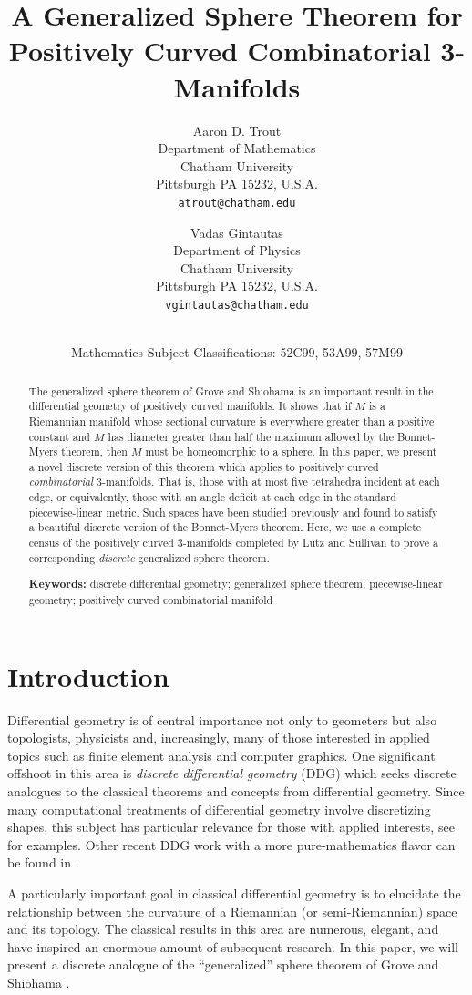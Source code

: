 \documentclass[12pt]{article}
\title{A Generalized Sphere Theorem for\\Positively Curved Combinatorial 3-Manifolds}
\author{Aaron D. Trout\\
\small Department of Mathematics\\[-0.8ex]
\small Chatham University\\[-0.8ex] 
\small Pittsburgh PA 15232,  U.S.A.\\
\small\tt atrout@chatham.edu\\
\and
Vadas Gintautas\\
\small Department of Physics\\[-0.8ex]
\small Chatham University\\[-0.8ex] 
\small Pittsburgh PA 15232,  U.S.A.\\
\small\tt vgintautas@chatham.edu}
\date{\dateline{June 25, 2013}{XX}\\
\small Mathematics Subject Classifications: 52C99, 53A99, 57M99}
\theoremstyle{plain}
\theoremstyle{definition}
\theoremstyle{remark}
\begin{document}
\maketitle

\begin{abstract}
The generalized sphere theorem of Grove and Shiohama is an important result in the differential geometry of positively curved manifolds. It shows that if $M$ is a Riemannian manifold whose sectional curvature is everywhere greater than a positive constant and $M$ has diameter greater than half the maximum allowed by the Bonnet-Myers theorem, then $M$ must be homeomorphic to a sphere. In this paper, we present a novel discrete version of this theorem which applies to positively curved {\em combinatorial} 3-manifolds. That is, those with at most five tetrahedra incident at each edge, or equivalently, those with an angle deficit at each edge in the standard piecewise-linear metric. Such spaces have been studied previously and found to satisfy a beautiful discrete version of the Bonnet-Myers theorem. Here, we use a complete census of the positively curved 3-manifolds completed by Lutz and Sullivan to prove a corresponding {\em discrete} generalized sphere theorem.

\bigskip\noindent \textbf{Keywords:} discrete differential geometry; generalized sphere theorem; piecewise-linear geometry; positively curved combinatorial manifold
\end{abstract}


\section{Introduction}

Differential geometry is of central importance not only to geometers but also topologists, physicists and, increasingly, many of those interested in applied topics such as finite element analysis and computer graphics. One significant offshoot in this area is {\em discrete differential geometry} (DDG) which seeks discrete analogues to the classical theorems and concepts from differential geometry. Since many computational treatments of differential geometry involve discretizing shapes, this subject has particular relevance for those with applied interests, see \cite{grinspun2006discrete} for examples. Other recent DDG work with a more pure-mathematics flavor can be found in \cite{BMM,Crowley,EMM,forman2,GGL1,GGL2,GGL3,stone}. 

A particularly important goal in classical differential geometry is to elucidate the relationship between the curvature of a Riemannian (or semi-Riemannian) space and its topology. The classical
results in this area are numerous, elegant, and have inspired an
enormous amount of subsequent research. In this paper, we will present a discrete analogue of the ``generalized'' sphere theorem of Grove and Shiohama \cite{groveshiohama}.
\end{document}
